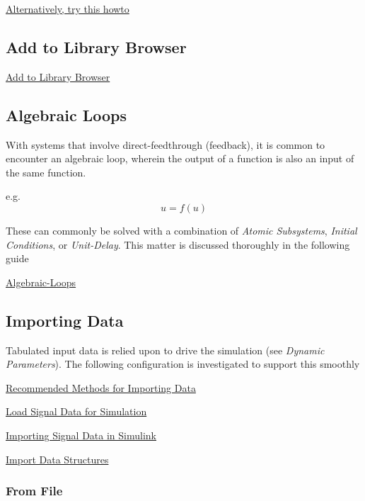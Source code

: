 \documentclass[]{article}
\begin{document}
\href{http://www3.nd.edu/~nancy/Math20550/Homework/matlabpath.pdf}{Alternatively,
try this howto}

\subsection{Add to Library Browser}\label{add-to-library-browser}

\href{http://www.mathworks.com/help/simulink/ug/adding-libraries-to-the-library-browser.html}{Add
to Library Browser}

\subsection{Algebraic Loops}\label{algebraic-loops}

With systems that involve direct-feedthrough (feedback), it is common to
encounter an algebraic loop, wherein the output of a function is also an
input of the same function.

e.g. \[ u = f(u) \]

These can commonly be solved with a combination of \emph{Atomic
Subsystems}, \emph{Initial Conditions}, or \emph{Unit-Delay}. This
matter is discussed thoroughly in the following guide

\href{http://www.mathworks.com/help/simulink/ug/algebraic-loops.html}{Algebraic-Loops}

\subsection{Importing Data}\label{importing-data}

Tabulated input data is relied upon to drive the simulation (see
\emph{Dynamic Parameters}). The following configuration is investigated
to support this smoothly

\href{http://www.mathworks.com/help/matlab/import_export/recommended-methods-for-importing-data.html}{Recommended
Methods for Importing Data}

\href{http://www.mathworks.com/help/simulink/import-data.html}{Load
Signal Data for Simulation}

\href{http://www.mathworks.com/help/simulink/ug/importing-signal-data-in-simulink.html}{Importing
Signal Data in Simulink}

\href{http://www.mathworks.com/help/simulink/ug/importing-data-structures-to-a-root-level-input-port.html}{Import
Data Structures}

\subsubsection{From File}\label{from-file}
\end{document}
